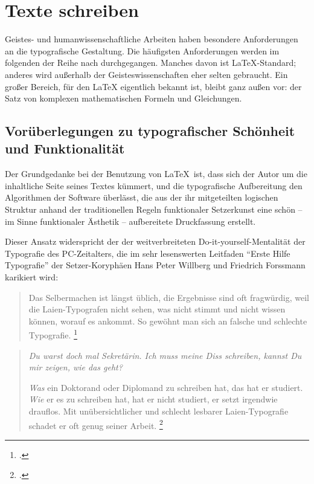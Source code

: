 
\chapter{Texte schreiben}

Geistes- und humanwissenschaftliche Arbeiten haben besondere Anforderungen an die typografische
Gestaltung. 
Die häufigsten Anforderungen werden im folgenden der Reihe nach durchgegangen.
Manches davon ist \LaTeX-Standard; anderes wird außerhalb der Geisteswissenschaften eher
selten gebraucht.
Ein großer Bereich, für den \LaTeX{} eigentlich bekannt ist, bleibt ganz außen vor:
der Satz von komplexen mathematischen Formeln und Gleichungen.


\section{Vorüberlegungen zu typografischer Schönheit und Funktionalität}


Der Grundgedanke bei der Benutzung von \LaTeX\ ist, dass sich der Autor um die inhaltliche Seite seines
Textes kümmert, und die typografische Aufbereitung den Algorithmen der Software überlässt, 
die aus der ihr mitgeteilten logischen Struktur anhand der traditionellen Regeln funktionaler Setzerkunst 
eine schön -- im Sinne funktionaler Ästhetik -- aufbereitete Druckfassung erstellt.

Dieser Ansatz widerspricht der der weitverbreiteten Do-it-yourself-Mentalität der Typografie des
PC-Zeitalters, die im sehr lesenswerten Leitfaden \enquote{Erste Hilfe Typografie} der Setzer-Koryphäen
Hans Peter Willberg und Friedrich Forssmann karikiert wird:

\begin{quote}
 Das Selbermachen ist längst üblich, die Ergebnisse sind oft fragwürdig,
 weil die Laien-Typografen nicht sehen, was nicht stimmt und nicht wissen
 können, worauf es ankommt.
 So gewöhnt man sich an falsche und schlechte Typografie.
 \footcite[9]{erste_hilfe}
 \end{quote}
 
\begin{quotation}
 \emph{Du warst doch mal Sekretärin.
 Ich muss meine Diss schreiben, kannst Du mir zeigen, wie das geht?}
 
 \emph{Was} ein Doktorand oder Diplomand zu schreiben hat, das hat er studiert.
 \emph{Wie} er es zu schreiben hat, hat er nicht studiert, er setzt irgendwie drauflos.
 Mit unübersichtlicher und schlecht lesbarer Laien-Typografie schadet er oft genug seiner Arbeit.
 \footcite[86]{erste_hilfe}
\end{quotation}

